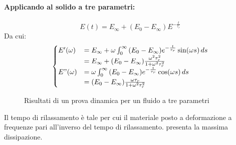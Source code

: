 \paragraph{Applicando al solido a tre parametri:}
\begin{equation}
E(t) = E_{\infty} + (E_0-E_{\infty})E^{-\frac{t}{\tau_r}}
\end{equation}
Da cui:
\begin{equation}
\begin{cases}
E'(\omega) &= E_{\infty} + \omega\int_0^{\infty}{(E_0-E_{\infty})e^{-\frac{t}{\tau_r}}\sin(\omega s)\,ds}\\
&= E_{\infty} + (E_0-E_{\infty})\frac{\omega^2\tau_r^2}{1+\omega^2\tau_r^2}\\
E"(\omega) &= \omega\int_0^{\infty}{(E_0-E_{\infty})e^{-\frac{t}{\tau_r}}\cos(\omega s)\,ds}\\
&= (E_0 - E_{\infty})\frac{\omega \tau_r}{1+\omega^2\tau_r^2}
\end{cases}
\end{equation}

\begin{figure}
\centering
{}\quad
{}
\caption{Risultati di un prova dinamica per un fluido a tre parametri}
\label{fig:3Param}
\end{figure}
Il tempo di rilassamento è tale per cui il materiale posto a deformazione a frequenze pari all'inverso del tempo di rilassamento. presenta la massima dissipazione.